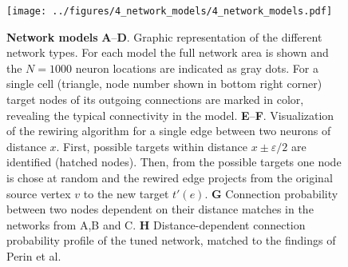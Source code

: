 
\begin{figure}[h]
    \vspace{0.25cm}
  \texttt{[image: ../figures/4\_network\_models/4\_network\_models.pdf]} %
  \vspace{0.15cm}
\caption{{\bf Network models} \textbf{A}--\textbf{D}. Graphic representation of the different network types. For each model the full network area is shown and the $N=1000$ neuron locations are indicated as gray dots. For a single cell (triangle, node number shown in bottom right corner) target nodes of its outgoing connections are marked in color, revealing the typical connectivity in the model. \textbf{E}--\textbf{F}. Visualization of the rewiring algorithm for a single edge between two neurons of distance $x$. First, possible targets within distance $x \pm \varepsilon/2$ are identified (hatched nodes). Then, from the possible targets one node is chose at random and the rewired edge projects from the original source vertex $v$ to the new target $t'(e)$. \textbf{G} Connection probability between two nodes dependent on their distance matches in the networks from A,B and C. \textbf{H} Distance-dependent connection probability profile of the tuned network, matched to the findings of Perin et al. %
}
\label{fig_model}%
\end{figure}
